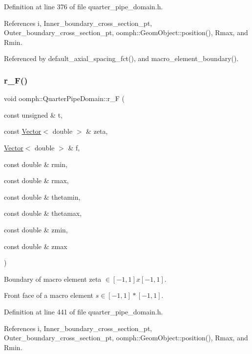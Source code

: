 Definition at line 376 of file quarter\+\_\+pipe\+\_\+domain.\+h.



References i, Inner\+\_\+boundary\+\_\+cross\+\_\+section\+\_\+pt, Outer\+\_\+boundary\+\_\+cross\+\_\+section\+\_\+pt, oomph\+::\+Geom\+Object\+::position(), Rmax, and Rmin.



Referenced by default\+\_\+axial\+\_\+spacing\+\_\+fct(), and macro\+\_\+element\+\_\+boundary().

\mbox{\label{classoomph_1_1QuarterPipeDomain_a85aaa5d1217c49e2144bbfd37dbad0fd}} 
\subsubsection{\texorpdfstring{r\+\_\+\+F()}{r\_F()}}
{\footnotesize\ttfamily void oomph\+::\+Quarter\+Pipe\+Domain\+::r\+\_\+F (\begin{DoxyParamCaption}\item[{const unsigned \&}]{t,  }\item[{const \hyperlink{classoomph_1_1Vector}{Vector}$<$ double $>$ \&}]{zeta,  }\item[{\hyperlink{classoomph_1_1Vector}{Vector}$<$ double $>$ \&}]{f,  }\item[{const double \&}]{rmin,  }\item[{const double \&}]{rmax,  }\item[{const double \&}]{thetamin,  }\item[{const double \&}]{thetamax,  }\item[{const double \&}]{zmin,  }\item[{const double \&}]{zmax }\end{DoxyParamCaption})\hspace{0.3cm}{\ttfamily [private]}}



Boundary of macro element zeta $ \in [-1,1]x[-1,1] $. 

Front face of a macro element $ s \in [-1,1]*[-1,1] $. 

Definition at line 441 of file quarter\+\_\+pipe\+\_\+domain.\+h.



References i, Inner\+\_\+boundary\+\_\+cross\+\_\+section\+\_\+pt, Outer\+\_\+boundary\+\_\+cross\+\_\+section\+\_\+pt, oomph\+::\+Geom\+Object\+::position(), Rmax, and Rmin.



